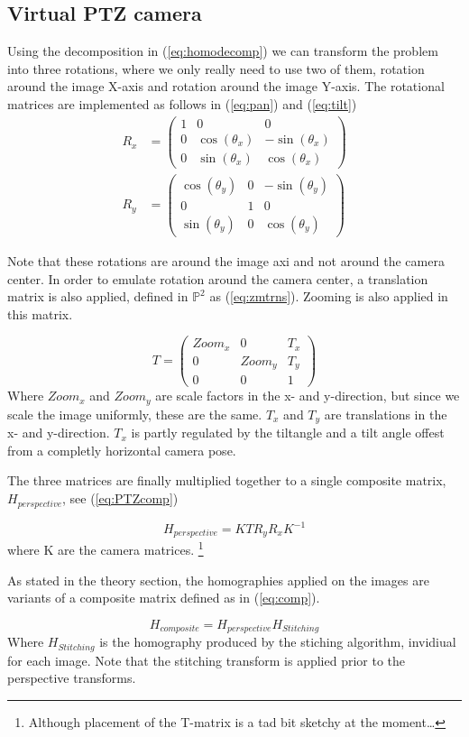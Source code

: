 \subsection{Virtual PTZ camera}
Using the decomposition in (\ref{eq:homodecomp}) we can transform the problem into three rotations, where we only really need to use two of them, rotation around the image X-axis and rotation around the image Y-axis. The rotational matrices are implemented as follows in (\ref{eq:pan}) and (\ref{eq:tilt})
	\begin{align}
		R_x &=\begin{pmatrix}1 & 0 & 0 \\
			0 & \cos(\theta_x) & -\sin(\theta_x) \\
			0 & \sin(\theta_x) & \cos(\theta_x)
		\end{pmatrix} \label{eq:pan}\\
		R_y&=\begin{pmatrix} \cos(\theta_y) & 0 & -\sin(\theta_y) \\
			0 & 1 & 0 \\
			\sin(\theta_y) & 0 & \cos(\theta_y)
		\end{pmatrix} \label{eq:tilt}
	\end{align}

	Note that these rotations are around the image axi and not around the camera center. In order to emulate rotation around the camera center, a translation matrix is also applied, defined in $\mathbb{P}^2$ as (\ref{eq:zmtrns}). Zooming is also applied in this matrix.

	\begin{equation}
		T=\begin{pmatrix}
			Zoom_x & 0 & T_x \\
			0 & Zoom_y & T_y \\
			0 & 0 & 1
		\end{pmatrix} \label{eq:zmtrns}
	\end{equation}
	Where $Zoom_x$ and $Zoom_y$ are scale factors in the x- and y-direction, but since we scale the image uniformly, these are the same. $T_x$ and $T_y$ are translations in the x- and y-direction. $T_x$ is partly regulated by the tiltangle and a tilt angle offest from a completly horizontal camera pose.

	The three matrices are finally multiplied together to a single composite matrix, $H_{perspective}$, see (\ref{eq:PTZcomp})

	\begin{equation}
		H_{perspective}=KTR_yR_xK^{-1}
		\label{eq:PTZcomp}
	\end{equation}
	where K are the camera matrices. \footnote{Although placement of the T-matrix is a tad bit sketchy at the moment\dots}

	As stated in the theory section, the homographies applied on the images are variants of a composite matrix defined as in (\ref{eq:comp}).

	\begin{equation}
		H_{composite}=H_{perspective}H_{Stitching}
		\label{eq:comp}
	\end{equation}
	Where $H_{Stitching}$ is the homography produced by the stiching algorithm, invidiual for each image. Note that the stitching transform is applied prior to the perspective transforms.
